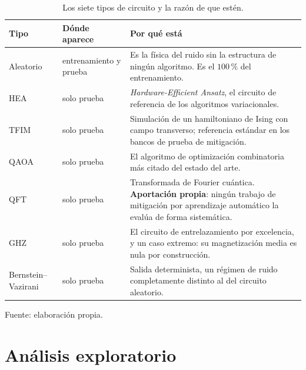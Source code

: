 \begin{table}[htbp]
    \centering
    \caption{Los siete tipos de circuito y la razón de que estén.}
    \label{tab:tipos}
    {\footnotesize
    \begin{tabular}{@{}llp{}@{}}
        \toprule
        \textbf{Tipo} & \textbf{Dónde aparece} & \textbf{Por qué está} \\
        \midrule
        Aleatorio & entrenamiento y prueba
            & Es la física del ruido sin la estructura de ningún algoritmo. Es el $100$\,\% del
              entrenamiento. \\
        HEA & solo prueba
            & \textit{Hardware-Efficient Ansatz}, el circuito de referencia de los algoritmos
              variacionales. \\
        TFIM & solo prueba
            & Simulación de un hamiltoniano de Ising con campo transverso; referencia estándar
              en los bancos de prueba de mitigación. \\
        QAOA & solo prueba
            & El algoritmo de optimización combinatoria más citado del estado del arte. \\
        QFT & solo prueba
            & Transformada de Fourier cuántica. \textbf{Aportación propia}: ningún trabajo de
              mitigación por aprendizaje automático la evalúa de forma sistemática. \\
        GHZ & solo prueba
            & El circuito de entrelazamiento por excelencia, y un caso extremo: su
              magnetización media es nula por construcción. \\
        Bernstein--Vazirani & solo prueba
            & Salida determinista, un régimen de ruido completamente distinto al del circuito
              aleatorio. \\
        \bottomrule
    \end{tabular}}

    {\footnotesize Fuente: elaboración propia.}
\end{table}

\section{Análisis exploratorio}
\label{sec:eda}

